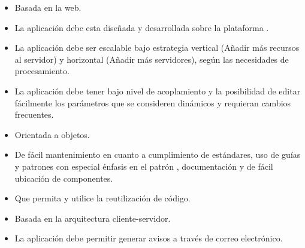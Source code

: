 \begin{itemize}
\item Basada en la web.
\item La aplicación debe esta diseñada y desarrollada sobre la plataforma
  .
\item La aplicación debe ser escalable bajo estrategia vertical (Añadir más
  recursos al servidor) y horizontal (Añadir más servidores), según las
  necesidades de procesamiento.
\item La aplicación debe tener bajo nivel de acoplamiento y la posibilidad de
  editar fácilmente los parámetros que se consideren dinámicos y requieran
  cambios frecuentes.
\item Orientada a objetos.
\item De fácil mantenimiento en cuanto a cumplimiento de estándares, uso de
  guías y patrones con especial énfasis en el patrón ,
  documentación y de fácil ubicación de componentes.
\item Que permita y utilice la reutilización de código.
\item Basada en la arquitectura cliente-servidor.
\item La aplicación debe permitir generar avisos a través de correo electrónico.
\end{itemize}

